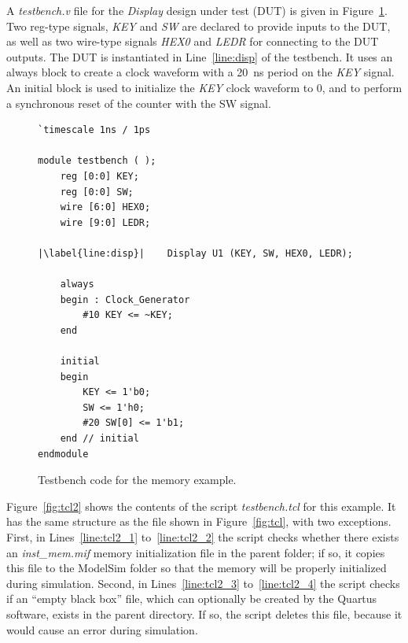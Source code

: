 \documentclass[11pt, twoside, pdftex]{article}
\begin{document}
\noindent
A {\it testbench.v} file for the {\it Display} design under test (DUT) is given in 
Figure~\ref{fig:tb3}. Two reg-type signals, {\it KEY} and {\it SW} are declared to provide 
inputs to the DUT, as well as two wire-type signals {\it HEX0} and {\it LEDR}
for connecting to the DUT outputs. The DUT is instantiated in Line~\ref{line:disp} of 
the testbench. It 
uses an always block to create a clock waveform with a 20~ns period on the {\it KEY} signal. An 
initial block is used to initialize the {\it KEY} clock waveform to 0, and to perform a synchronous 
reset of the counter with the SW signal. 

\lstset{language=Verilog,numbers=left,escapechar=|}
\begin{figure}[h]
\begin{center}
\begin{minipage}[t]{12.5 cm}
\begin{lstlisting}[name=testbench3]
`timescale 1ns / 1ps

module testbench ( );
    reg [0:0] KEY;
    reg [0:0] SW;
    wire [6:0] HEX0;
    wire [9:0] LEDR;

|\label{line:disp}|    Display U1 (KEY, SW, HEX0, LEDR);

    always
    begin : Clock_Generator
        #10 KEY <= ~KEY;
    end

    initial
    begin
        KEY <= 1'b0;
        SW <= 1'h0;
        #20 SW[0] <= 1'b1;
    end // initial
endmodule
\end{lstlisting}
\end{minipage}
\caption{Testbench code for the memory example.}
\label{fig:tb3}
\end{center}
\end{figure}

\noindent
Figure~\ref{fig:tcl2} shows the contents of the script {\it testbench.tcl} for this example.
It has the same structure as the file shown in Figure~\ref{fig:tcl}, with two exceptions. 
First, in Lines~\ref{line:tcl2_1} to~\ref{line:tcl2_2} the script checks whether there 
exists an {\it inst\_mem.mif} memory initialization file in the parent folder; if so, 
it copies this file to the ModelSim folder so that the memory will be properly initialized
during simulation. Second, in Lines~\ref{line:tcl2_3} 
to~\ref{line:tcl2_4} the script checks if an ``empty black box'' file, which can 
optionally be created by the Quartus software, exists in the parent directory. 
If so, the script deletes this file, because it would cause an error during simulation.
\end{document}
